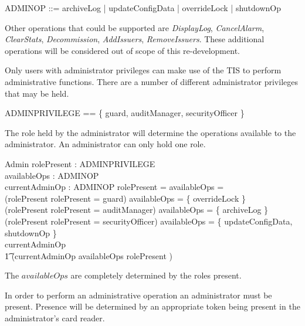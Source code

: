 \begin{latezed}
        ADMINOP ::=  archiveLog | updateConfigData |
        overrideLock | shutdownOp 
\end{latezed}

Other operations that could be supported are 
{\em DisplayLog}, 
{\em CancelAlarm}, 
{\em ClearStats}, 
{\em Decommission}, 
{\em AddIssuers}, 
{\em RemoveIssuers}.
These additional operations will be considered out of scope of this
re-development. 

Only users with administrator privileges can make use of the TIS to
perform administrative functions. There are a number of different
administrator privileges that may be held.

\begin{zed}
        ADMINPRIVILEGE == \{ guard, auditManager, securityOfficer \}
\end{zed}

The role held by the administrator will determine the operations
available to the administrator. An administrator
can only hold one role.

\begin{schema}{Admin}
        rolePresent : \Optional ADMINPRIVILEGE
\\      availableOps : \power ADMINOP
\\      currentAdminOp : \Optional ADMINOP
\where
        rolePresent = \Nil \implies availableOps = \emptyset 
\\      (rolePresent \neq \Nil \land \The rolePresent = guard) \implies availableOps = 
        \{ overrideLock \}
\\      (rolePresent \neq \Nil \land \The rolePresent = auditManager) \implies availableOps = 
        \{ archiveLog \}
\\      (rolePresent \neq \Nil \land \The rolePresent = securityOfficer) \implies availableOps = 
        \{ updateConfigData, shutdownOp \}
\\      currentAdminOp \neq \Nil \implies 
\\ \t1 (\The currentAdminOp \in availableOps \land rolePresent \neq \Nil )
\end{schema}
\begin{Zcomment}
\item
The $availableOps$ are completely determined by the roles present.
\end{Zcomment}

In order to perform an administrative operation an administrator must
be present. Presence will be determined by an appropriate token being
present in the administrator's card reader.

